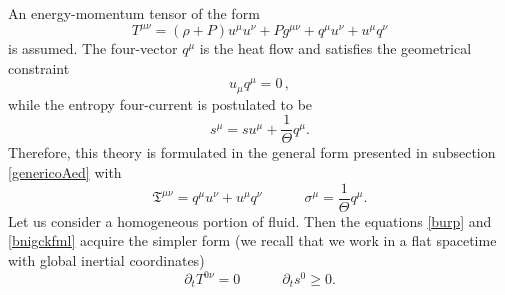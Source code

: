 \documentclass[a4paper, amsfonts, amssymb, amsmath, reprint, showkeys, nofootinbib, twoside]{revtex4-1}
\newcommand{\spc}{\quad \quad \quad}
\begin{document}
An energy-momentum tensor of the form
\begin{equation}\label{TTT}
T^{\mu \nu} = (\rho +P)u^\mu u^\nu +P g^{\mu \nu} + q^\mu u^\nu + u^\mu q^\nu
\end{equation}
is assumed. The four-vector $q^\mu$ is the heat flow and satisfies the geometrical constraint
\begin{equation}\label{uq}
u_\mu q^\mu =0 \, ,
\end{equation}
while the entropy four-current is postulated to be
\begin{equation}\label{entropppP}
s^\mu = su^\mu + \dfrac{1}{\Theta} q^\mu.
\end{equation}
Therefore, this theory is formulated in the general form presented in subsection \ref{genericoAed} with
\begin{equation}
\mathfrak{T}^{\mu \nu}= q^\mu u^\nu + u^\mu q^\nu  \spc \sigma^\mu = \dfrac{1}{\Theta} q^\mu.
\end{equation}
Let us consider a homogeneous portion of fluid. Then the equations \eqref{burp} and \eqref{bnigckfml} acquire the simpler form (we recall that we work in a flat spacetime with global inertial coordinates)
\begin{equation}\label{burp2}
\partial_t T^{0 \nu} =0  \spc  \partial_t s^0 \geq 0.
\end{equation} 
\end{document}
